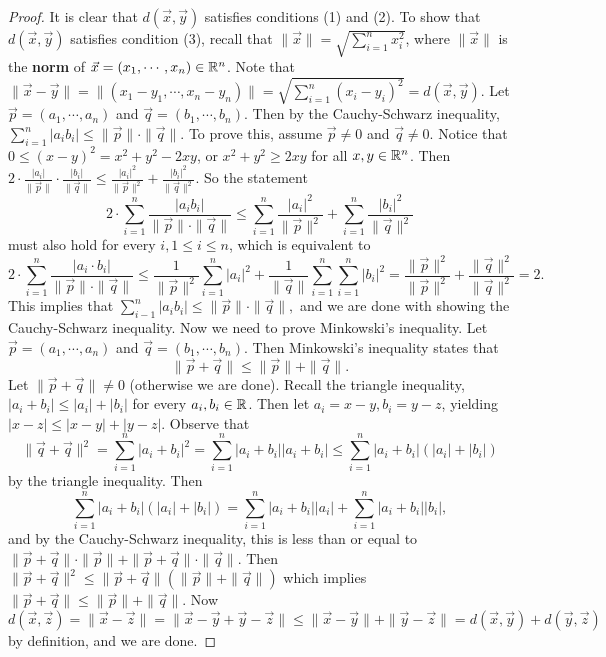 \begin{proof}
    It is clear that $d(\vec x, \vec y)$ satisfies conditions (1) and (2). To show that $d(\vec x, \vec y)$ satisfies condition (3), recall that $\|\vec x\|=\sqrt{\sum_{i=1}^{n} x_i  ^2} $, where $\| \vec x\|$ is the \textbf{norm} of $\vec x= (x_1,\cdots ,x_n ) \in \mathbb{R}^n $. Note that $\|\vec x-\vec y\|= \|(x_1-y_1, \cdots ,x_n -y_n )\|= \sqrt{\sum_{i=1}^{n} (x_i -y_i )^2} =d(\vec x,\vec y)$. Let $\vec p = (a_1, \cdots ,a_n )$ and $\vec q=(b_1, \cdots ,b_n )$. Then by the Cauchy-Schwarz inequality, $\sum_{i=1}^{n} | a _i  b _i  | \leq \| \vec p\| \cdot \| \vec q\|$. To prove this, assume $\vec p \neq 0$ and $\vec q \neq 0$. Notice that $0 \leq (x-y)^2 = x^2+y^2-2xy$, or $x^2+y^2 \geq 2xy$ for all $x,y \in \mathbb{R}^n $. Then $2\cdot  \frac{|a_i |}{\| \vec p\|}\cdot  \frac{|b_i |}{\|\vec q\|}\leq \frac{|a_i |^2}{\|\vec p\|^2}+ \frac{|b_i |^2}{\| \vec q\|^2}$. So the statement \[
    2 \cdot \sum_{i=1}^{n} \frac{|a_i b_i |}{\| \vec p\|\cdot  \|\vec q\|} \leq \sum_{i=1}^{n} \frac{|a_i |^2}{\| \vec p\|^2}+ \sum_{i=1}^{n} \frac{|b_i |^2}{\| \vec q\|^2}
    \] must also hold for every $i, 1 \leq i \leq n$, which is equivalent to \[
    2 \cdot \sum_{i=1}^{n} \frac{|a_i  \cdot b_i |}{\| \vec p\|\cdot \| \vec q\|} \leq \frac{1}{\|\vec p\|^2}\sum_{i=1}^{n} |a_i |^2+ \frac{1}{\|\vec q\|}\sum_{i=1}^{n} \sum_{i=1}^{n} |b_i |^2=\frac{\|\vec p\|^2}{\|\vec p\|^2}+ \frac{\|\vec q\|^2}{\|\vec q\|^2}=2.
\] This implies that $\sum_{i-1}^{n} |a_i  b_i  | \leq \| \vec p\|\cdot  \| \vec q\|, $ and we are done with showing the Cauchy-Schwarz inequality. Now we need to prove Minkowski's inequality. Let $\vec p = (a_1, \cdots , a_n )$ and $\vec q = (b_1 , \cdots , b_n )$. Then Minkowski's inequality states that  \[
\| \vec p + \vec q \|\leq \| \vec p \|+ \|\vec q\|.
\] 
Let $\| \vec p+\vec q\|\neq 0$ (otherwise we are done). Recall the triangle inequality, $|a_i +b_i | \leq |a_i |+|b_i | $ for every $a_i , b_i  \in \mathbb{R}$. Then let $a_i =x-y, b_i =y-z$, yielding $|x-z| \leq |x-y|+|y-z|$. Observe that \[
    \|\vec q + \vec q\|^2= \sum_{i=1}^{n} |a_i +b_i |^2= \sum_{i=1}^{n} |a_i +b_i | | a_i +b_i | \leq \sum_{i=1}^{n} |a_i +b_i | ( |a_i | + |b_i |)
\] by the triangle inequality. Then \[
\sum_{i=1}^{n} |a_i +b_i |(|a_i |+|b_i |) = \sum_{i=1}^{n} |a_i +b_i | |a_i | + \sum_{i=1}^{n} |a_i +b_i| | b_i |,
\] and by the Cauchy-Schwarz inequality, this is less than or equal to $\| \vec p + \vec q\| \cdot  \| \vec p\| + \|\vec p + \vec q\| \cdot \| \vec q\|. $ Then $\| \vec p + \vec q\|^2 \leq \|\vec p + \vec q\|( \| \vec p\|+\|\vec q\|)$ which implies $\|\vec p+\vec q\|\leq \| \vec p\|+ \|\vec q\|$. Now $d(\vec x,\vec z)= \| \vec x- \vec z\|=\|\vec x -\vec y + \vec y -\vec z\|\leq \| \vec x-\vec y\|+ \|\vec y -\vec z\|=d(\vec x,\vec y)+d(\vec y, \vec z)$ by definition, and we are done.
\end{proof}
